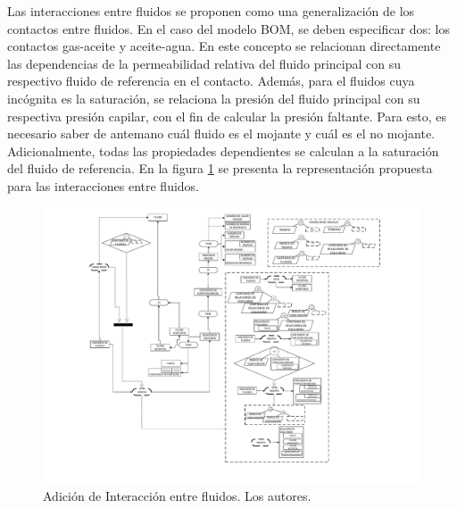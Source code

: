 Las interacciones entre fluidos se proponen como una generalización de los contactos entre fluidos. En el caso del modelo BOM, se deben especificar dos: los contactos gas-aceite y aceite-agua. En este concepto se relacionan directamente las dependencias de la permeabilidad relativa del fluido principal con su respectivo fluido de referencia en el contacto. Además, para el fluidos cuya incógnita es la saturación, se relaciona la presión del fluido principal con su respectiva presión capilar, con el fin de calcular la presión faltante. Para esto, es necesario saber de antemano cuál fluido es el mojante y cuál es el no mojante. Adicionalmente, todas las propiedades dependientes se calculan a la saturación del fluido de referencia. En la figura \ref{fig:Contact} se presenta la representación propuesta para las interacciones entre fluidos.

\begin{figure}[b]
	\centering%
	\includegraphics[width=0.9\linewidth]{Fig/Equilibrium.pdf}%
	\caption{Adición de Interacción entre fluidos. Los autores.} \label{fig:Contact}
\end{figure}
